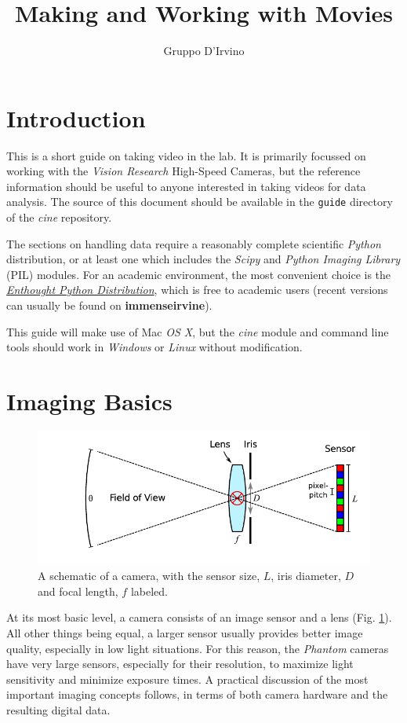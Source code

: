 \documentclass[11pt]{amsart}
\title{Making and Working with Movies}
\author{Gruppo D'Irvino}
\begin{document}
\maketitle
\section{Introduction}
This is a short guide on taking video in the lab.
It is primarily focussed on working with the \emph{Vision Research} High-Speed Cameras, but the reference information should be useful to anyone interested in taking videos for data analysis.
The source of this document should be available in the \texttt{guide} directory of the \emph{cine} repository.

The sections on handling data require a reasonably complete scientific \emph{Python} distribution, or at least one which includes the \emph{Scipy} and \emph{Python Imaging Library} (PIL) modules.
For an academic environment, the most convenient choice is the \href{http://www.enthought.com/}{\emph{Enthought Python Distribution}}, which is free to academic users (recent versions can usually be found on {\bf immenseirvine}).

This guide will make use of Mac \emph{OS X}, but the \emph{cine} module and command line tools should work in \emph{Windows} or \emph{Linux} without modification. 

\section{Imaging Basics}
\begin{figure}
\includegraphics{figures/camera.pdf}
\caption{A schematic of a camera, with the sensor size, $L$, iris diameter, $D$ and focal length, $f$ labeled.}
\label{fig:camera}
\end{figure}

At its most basic level, a camera consists of an image sensor and a lens (Fig. \ref{fig:camera}).
All other things being equal, a larger sensor usually provides better image quality, especially in low light situations.
For this reason, the \emph{Phantom} cameras have very large sensors, especially for their resolution, to maximize light sensitivity and minimize exposure times.
A practical discussion of the most important imaging concepts follows, in terms of both camera hardware and the resulting digital data.
\end{document}
